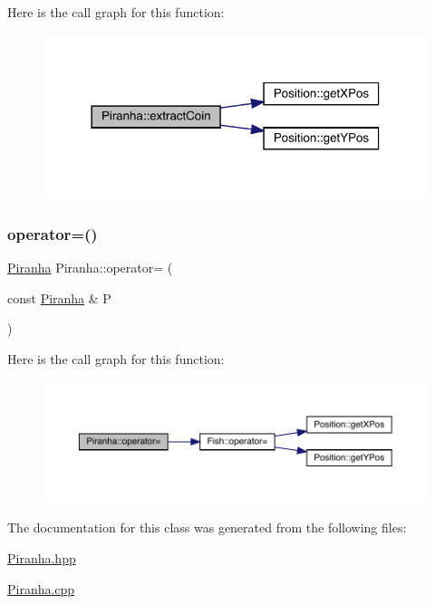 Here is the call graph for this function\+:
\nopagebreak
\begin{figure}[H]
\begin{center}
\leavevmode
\includegraphics[width=318pt]{class_piranha_aed1eb8799f7b92fbfb47fd760bf31cbf_cgraph}
\end{center}
\end{figure}
\mbox{\label{class_piranha_a3f3a74ccd3e74052a78134c597fa6827}} 
\subsubsection{\texorpdfstring{operator=()}{operator=()}}
{\footnotesize\ttfamily \mbox{\hyperlink{class_piranha}{Piranha}} Piranha\+::operator= (\begin{DoxyParamCaption}\item[{const \mbox{\hyperlink{class_piranha}{Piranha}} \&}]{P }\end{DoxyParamCaption})}

Here is the call graph for this function\+:
\nopagebreak
\begin{figure}[H]
\begin{center}
\leavevmode
\includegraphics[width=350pt]{class_piranha_a3f3a74ccd3e74052a78134c597fa6827_cgraph}
\end{center}
\end{figure}


The documentation for this class was generated from the following files\+:\begin{DoxyCompactItemize}
\item 
\mbox{\hyperlink{_piranha_8hpp}{Piranha.\+hpp}}\item 
\mbox{\hyperlink{_piranha_8cpp}{Piranha.\+cpp}}\end{DoxyCompactItemize}
